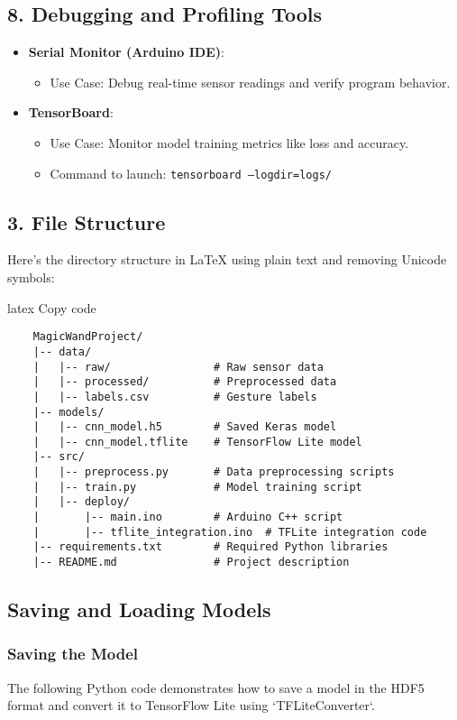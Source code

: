\subsection{8. Debugging and Profiling Tools}
\begin{itemize}
    \item \textbf{Serial Monitor (Arduino IDE)}: 
    \begin{itemize}
        \item Use Case: Debug real-time sensor readings and verify program behavior.
    \end{itemize}
    \item \textbf{TensorBoard}: 
    \begin{itemize}
        \item Use Case: Monitor model training metrics like loss and accuracy.
        \item Command to launch: \texttt{tensorboard --logdir=logs/}
    \end{itemize}
\end{itemize}

\subsection{3. File Structure}

Here's the directory structure in LaTeX using plain text and removing Unicode symbols:

latex
Copy code
\begin{verbatim}
	MagicWandProject/
	|-- data/
	|   |-- raw/                # Raw sensor data
	|   |-- processed/          # Preprocessed data
	|   |-- labels.csv          # Gesture labels
	|-- models/
	|   |-- cnn_model.h5        # Saved Keras model
	|   |-- cnn_model.tflite    # TensorFlow Lite model
	|-- src/
	|   |-- preprocess.py       # Data preprocessing scripts
	|   |-- train.py            # Model training script
	|   |-- deploy/
	|       |-- main.ino        # Arduino C++ script
	|       |-- tflite_integration.ino  # TFLite integration code
	|-- requirements.txt        # Required Python libraries
	|-- README.md               # Project description
\end{verbatim}

\subsection{Saving and Loading Models}

\subsubsection{Saving the Model}
The following Python code demonstrates how to save a model in the HDF5 format and convert it to TensorFlow Lite using `TFLiteConverter`.


